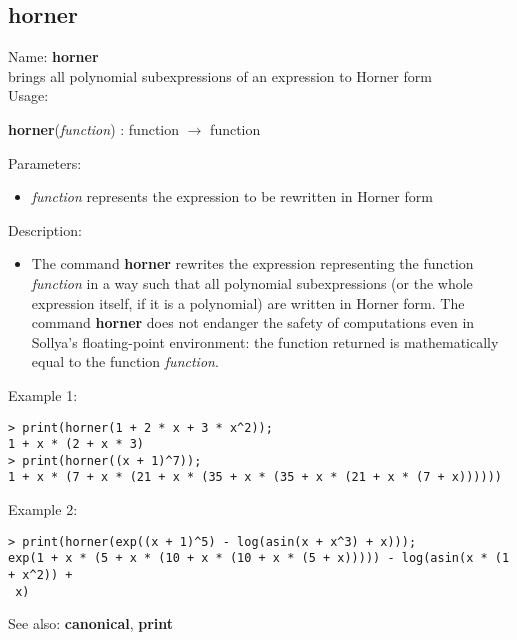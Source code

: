 \subsection{ horner }
\noindent Name: \textbf{horner}\\
brings all polynomial subexpressions of an expression to Horner form\\

\noindent Usage: 
\begin{center}
\textbf{horner}(\emph{function}) : \textsf{function} $\rightarrow$ \textsf{function}\\
\end{center}
Parameters: 
\begin{itemize}
\item \emph{function} represents the expression to be rewritten in Horner form
\end{itemize}
\noindent Description: \begin{itemize}

\item The command \textbf{horner} rewrites the expression representing the function
   \emph{function} in a way such that all polynomial subexpressions (or the
   whole expression itself, if it is a polynomial) are written in Horner
   form.  The command \textbf{horner} does not endanger the safety of
   computations even in Sollya's floating-point environment: the
   function returned is mathematically equal to the function \emph{function}.
\end{itemize}
\noindent Example 1: 
\begin{center}\begin{minipage}{15cm}\begin{Verbatim}[frame=single]
> print(horner(1 + 2 * x + 3 * x^2));
1 + x * (2 + x * 3)
> print(horner((x + 1)^7));
1 + x * (7 + x * (21 + x * (35 + x * (35 + x * (21 + x * (7 + x))))))
\end{Verbatim}
\end{minipage}\end{center}
\noindent Example 2: 
\begin{center}\begin{minipage}{15cm}\begin{Verbatim}[frame=single]
> print(horner(exp((x + 1)^5) - log(asin(x + x^3) + x)));
exp(1 + x * (5 + x * (10 + x * (10 + x * (5 + x))))) - log(asin(x * (1 + x^2)) +
 x)
\end{Verbatim}
\end{minipage}\end{center}
See also: \textbf{canonical}, \textbf{print}
